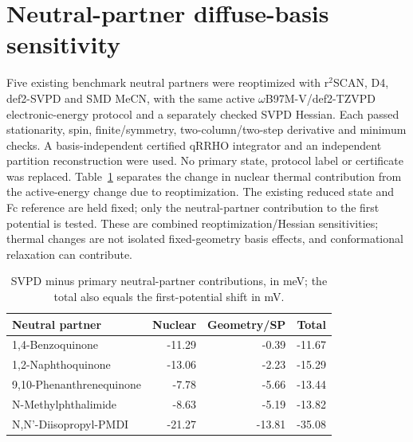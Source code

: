 \documentclass[11pt]{article}
\begin{document}
\section{Neutral-partner diffuse-basis sensitivity}
Five existing benchmark neutral partners were reoptimized with r$^2$SCAN, D4, def2-SVPD and SMD MeCN, with the same active $\omega$B97M-V/def2-TZVPD electronic-energy protocol and a separately checked SVPD Hessian. Each passed stationarity, spin, finite/symmetry, two-column/two-step derivative and minimum checks. A basis-independent certified qRRHO integrator and an independent partition reconstruction were used. No primary state, protocol label or certificate was replaced. Table~\ref{tab:basis} separates the change in nuclear thermal contribution from the active-energy change due to reoptimization. The existing reduced state and Fc reference are held fixed; only the neutral-partner contribution to the first potential is tested. These are combined reoptimization/Hessian sensitivities; thermal changes are not isolated fixed-geometry basis effects, and conformational relaxation can contribute.
\begin{table}[htbp]\centering
\caption{SVPD minus primary neutral-partner contributions, in meV; the total also equals the first-potential shift in mV.}
\label{tab:basis}
\begin{tabular}{lrrr}\toprule
Neutral partner & Nuclear & Geometry/SP & Total\\\midrule
1,4-Benzoquinone & -11.29 & -0.39 & -11.67\\
1,2-Naphthoquinone & -13.06 & -2.23 & -15.29\\
9,10-Phenanthrenequinone & -7.78 & -5.66 & -13.44\\
N-Methylphthalimide & -8.63 & -5.19 & -13.82\\
N,N'-Diisopropyl-PMDI & -21.27 & -13.81 & -35.08\\\bottomrule
\end{tabular}\end{table}
\end{document}
